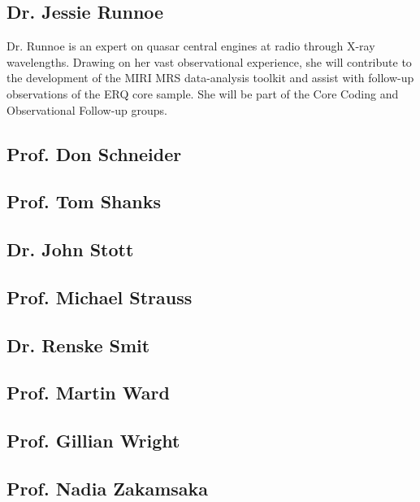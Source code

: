 \subsection{Dr. Jessie Runnoe}
Dr. Runnoe is an expert on quasar central engines at radio through
X-ray wavelengths.  Drawing on her vast observational experience, she
will contribute to the development of the MIRI MRS data-analysis
toolkit and assist with follow-up observations of the ERQ core sample.
She will be part of the Core Coding and Observational Follow-up
groups.

\subsection{Prof. Don Schneider}


\subsection{Prof. Tom Shanks}	


\subsection{Dr. John Stott}


\subsection{Prof. Michael  Strauss}


\subsection{Dr. Renske Smit}		


\subsection{Prof. Martin Ward}		


\subsection{Prof. Gillian Wright}


\subsection{Prof. Nadia Zakamsaka} 